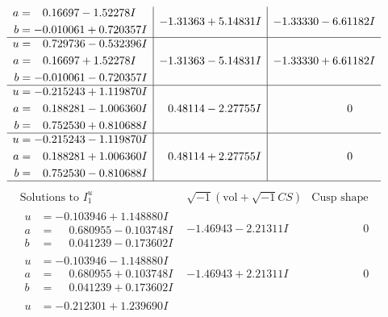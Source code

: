 \documentclass[1p]{elsarticle_modified}
\theoremstyle{definition}
\newcommand{\I}{\sqrt{-1}}
\begin{document}
$$\begin{array}{c|c|c}
\begin{aligned}
a &= \phantom{-}0.16697 - 1.52278 I \\
b &= -0.010061 + 0.720357 I\end{aligned}
 & -1.31363 + 5.14831 I & -1.33330 - 6.61182 I \\ \hline\begin{aligned}
u &= \phantom{-}0.729736 - 0.532396 I \\
a &= \phantom{-}0.16697 + 1.52278 I \\
b &= -0.010061 - 0.720357 I\end{aligned}
 & -1.31363 - 5.14831 I & -1.33330 + 6.61182 I \\ \hline\begin{aligned}
u &= -0.215243 + 1.119870 I \\
a &= \phantom{-}0.188281 - 1.006360 I \\
b &= \phantom{-}0.752530 + 0.810688 I\end{aligned}
 & \phantom{-}0.48114 - 2.27755 I & \phantom{-0.000000 } 0 \\ \hline\begin{aligned}
u &= -0.215243 - 1.119870 I \\
a &= \phantom{-}0.188281 + 1.006360 I \\
b &= \phantom{-}0.752530 - 0.810688 I\end{aligned}
 & \phantom{-}0.48114 + 2.27755 I & \phantom{-0.000000 } 0\\
 \hline 
 \end{array}$$\newpage$$\begin{array}{c|c|c}  
\text{Solutions to }I^u_{1}& \I (\text{vol} + \sqrt{-1}CS) & \text{Cusp shape}\\
 \hline 
\begin{aligned}
u &= -0.103946 + 1.148880 I \\
a &= \phantom{-}0.680955 - 0.103748 I \\
b &= \phantom{-}0.041239 - 0.173602 I\end{aligned}
 & -1.46943 - 2.21311 I & \phantom{-0.000000 } 0 \\ \hline\begin{aligned}
u &= -0.103946 - 1.148880 I \\
a &= \phantom{-}0.680955 + 0.103748 I \\
b &= \phantom{-}0.041239 + 0.173602 I\end{aligned}
 & -1.46943 + 2.21311 I & \phantom{-0.000000 } 0 \\ \hline\begin{aligned}
u &= -0.212301 + 1.239690 I \\

\end{aligned}
\end{array}$$
\end{document}
